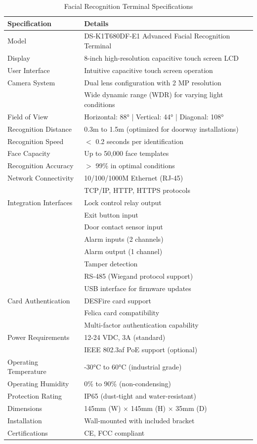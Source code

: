 \documentclass[12pt]{article}
\begin{document}
\begin{table}[H]
\centering
\begin{tabularx}{\textwidth}{lX}
\toprule
\textbf{Specification} & \textbf{Details} \\
\midrule
Model & DS-K1T680DF-E1 Advanced Facial Recognition Terminal \\
Display & 8-inch high-resolution capacitive touch screen LCD \\
User Interface & Intuitive capacitive touch screen operation \\
Camera System & Dual lens configuration with 2 MP resolution \\
 & Wide dynamic range (WDR) for varying light conditions \\
Field of View & Horizontal: 88° | Vertical: 44° | Diagonal: 108° \\
Recognition Distance & 0.3m to 1.5m (optimized for doorway installations) \\
Recognition Speed & $<$ 0.2 seconds per identification \\
Face Capacity & Up to 50,000 face templates \\
Recognition Accuracy & $>$ 99\% in optimal conditions \\
Network Connectivity & 10/100/1000M Ethernet (RJ-45) \\
 & TCP/IP, HTTP, HTTPS protocols \\
Integration Interfaces & Lock control relay output \\
 & Exit button input \\
 & Door contact sensor input \\
 & Alarm inputs (2 channels) \\
 & Alarm output (1 channel) \\
 & Tamper detection \\
 & RS-485 (Wiegand protocol support) \\
 & USB interface for firmware updates \\
Card Authentication & DESFire card support \\
 & Felica card compatibility \\
 & Multi-factor authentication capability \\
Power Requirements & 12-24 VDC, 3A (standard) \\
 & IEEE 802.3af PoE support (optional) \\
Operating Temperature & -30°C to 60°C (industrial grade) \\
Operating Humidity & 0\% to 90\% (non-condensing) \\
Protection Rating & IP65 (dust-tight and water-resistant) \\
Dimensions & 145mm (W) × 145mm (H) × 35mm (D) \\
Installation & Wall-mounted with included bracket \\
Certifications & CE, FCC compliant \\
\bottomrule
\end{tabularx}
\caption{Facial Recognition Terminal Specifications}
\end{table}
\end{document}
